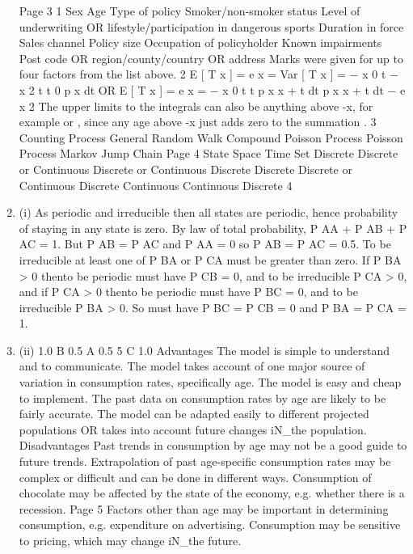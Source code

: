 \documentclass[a4paper,12pt]{article}
\begin{document}
\begin{enumerate}
Page 3 %
1
Sex
Age
Type of policy
Smoker/non-smoker status
Level of underwriting OR lifestyle/participation in dangerous sports
Duration in force
Sales channel
Policy size
Occupation of policyholder
Known impairments
Post code OR region/county/country OR address
Marks were given for up to four factors from the list above.
2
E [ T x ] = e x = \int
Var [ T x ] =
{ \int
\omega− x
0
t
\omega− x 2
t t
0
p x dt
OR
E [ T x ] = e x = \int
\omega− x
0
t t p x \mu x + t dt
}
p x \mu x + t dt − e x 2
The upper limits to the integrals can also be anything above \omega-x, for example \omega or \infty, since
any age above \omega-x just adds zero to the summation .
3
Counting Process
General Random Walk
Compound Poisson Process
Poisson Process
Markov Jump Chain
Page 4
State Space Time Set
Discrete
Discrete or Continuous
Discrete or Continuous
Discrete
Discrete Discrete or Continuous
Discrete
Continuous
Continuous
Discrete %
4
\item (i)
As periodic and irreducible then all states are periodic, hence
probability of staying in any state is zero.
By law of total probability, P AA + P AB + P AC = 1.
But P AB = P AC and P AA = 0 so P AB = P AC = 0.5.
To be irreducible at least one of P BA or P CA must be greater than zero.
If P BA > 0 thento be periodic must have P CB = 0,
and to be irreducible P CA > 0,
and if P CA > 0 thento be periodic must have P BC = 0, and to be
irreducible P BA > 0.
So must have P BC = P CB = 0 and P BA = P CA = 1.
\item (ii)
1.0
B
0.5
A
0.5
5
C
1.0
Advantages
The model is simple to understand and to communicate.
The model takes account of one major source of variation in consumption
rates, specifically age.
The model is easy and cheap to implement.
The past data on consumption rates by age are likely to be fairly accurate.
The model can be adapted easily to different projected populations OR takes
into account future changes iN_the population.
Disadvantages
Past trends in consumption by age may not be a good guide to future trends.
Extrapolation of past age-specific consumption rates may be complex or
difficult and can be done in different ways.
Consumption of chocolate may be affected by the state of the economy,
e.g. whether there is a recession.
Page 5 %
Factors other than age may be important in determining consumption,
e.g. expenditure on advertising.
Consumption may be sensitive to pricing, which may change iN_the future.

\end{enumerate}
\end{document}
